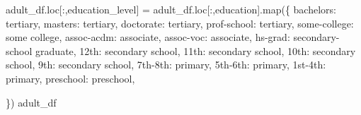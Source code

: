 \documentclass[
  letterpaper,
  DIV=11,
  numbers=noendperiod]{scrartcl}
\newenvironment{Shaded}{\begin{snugshade}}{\end{snugshade}}
\newcommand{\BuiltInTok}[1]{\textcolor[rgb]{0.00,0.23,0.31}{#1}}
\newcommand{\NormalTok}[1]{\textcolor[rgb]{0.00,0.23,0.31}{#1}}
\newcommand{\OperatorTok}[1]{\textcolor[rgb]{0.37,0.37,0.37}{#1}}
\newcommand{\StringTok}[1]{\textcolor[rgb]{0.13,0.47,0.30}{#1}}
\begin{document}
\begin{Shaded}
\begin{Highlighting}[]
\NormalTok{adult\_df.loc[:,}\StringTok{\textquotesingle{}education\_level\textquotesingle{}}\NormalTok{] }\OperatorTok{=}\NormalTok{ adult\_df.loc[:,}\StringTok{\textquotesingle{}education\textquotesingle{}}\NormalTok{].}\BuiltInTok{map}\NormalTok{(\{}
    \StringTok{\textquotesingle{}bachelors\textquotesingle{}}\NormalTok{: }\StringTok{\textquotesingle{}tertiary\textquotesingle{}}\NormalTok{,}
    \StringTok{\textquotesingle{}masters\textquotesingle{}}\NormalTok{: }\StringTok{\textquotesingle{}tertiary\textquotesingle{}}\NormalTok{, }
    \StringTok{\textquotesingle{}doctorate\textquotesingle{}}\NormalTok{: }\StringTok{\textquotesingle{}tertiary\textquotesingle{}}\NormalTok{, }
    \StringTok{\textquotesingle{}prof{-}school\textquotesingle{}}\NormalTok{: }\StringTok{\textquotesingle{}tertiary\textquotesingle{}}\NormalTok{, }
    \StringTok{\textquotesingle{}some{-}college\textquotesingle{}}\NormalTok{: }\StringTok{\textquotesingle{}some college\textquotesingle{}}\NormalTok{, }
    \StringTok{\textquotesingle{}assoc{-}acdm\textquotesingle{}}\NormalTok{: }\StringTok{\textquotesingle{}associate\textquotesingle{}}\NormalTok{, }
    \StringTok{\textquotesingle{}assoc{-}voc\textquotesingle{}}\NormalTok{: }\StringTok{\textquotesingle{}associate\textquotesingle{}}\NormalTok{,  }
    \StringTok{\textquotesingle{}hs{-}grad\textquotesingle{}}\NormalTok{: }\StringTok{\textquotesingle{}secondary{-}school graduate\textquotesingle{}}\NormalTok{, }
    \StringTok{\textquotesingle{}12th\textquotesingle{}}\NormalTok{: }\StringTok{\textquotesingle{}secondary school\textquotesingle{}}\NormalTok{,}
    \StringTok{\textquotesingle{}11th\textquotesingle{}}\NormalTok{: }\StringTok{\textquotesingle{}secondary school\textquotesingle{}}\NormalTok{,}
    \StringTok{\textquotesingle{}10th\textquotesingle{}}\NormalTok{: }\StringTok{\textquotesingle{}secondary school\textquotesingle{}}\NormalTok{,}
    \StringTok{\textquotesingle{}9th\textquotesingle{}}\NormalTok{: }\StringTok{\textquotesingle{}secondary school\textquotesingle{}}\NormalTok{,}
    \StringTok{\textquotesingle{}7th{-}8th\textquotesingle{}}\NormalTok{: }\StringTok{\textquotesingle{}primary\textquotesingle{}}\NormalTok{, }
    \StringTok{\textquotesingle{}5th{-}6th\textquotesingle{}}\NormalTok{: }\StringTok{\textquotesingle{}primary\textquotesingle{}}\NormalTok{, }
    \StringTok{\textquotesingle{}1st{-}4th\textquotesingle{}}\NormalTok{: }\StringTok{\textquotesingle{}primary\textquotesingle{}}\NormalTok{,}
    \StringTok{\textquotesingle{}preschool\textquotesingle{}}\NormalTok{: }\StringTok{\textquotesingle{}preschool\textquotesingle{}}\NormalTok{, }
    
    
\NormalTok{\})}
\NormalTok{adult\_df}
\end{Highlighting}
\end{Shaded}
\end{document}
